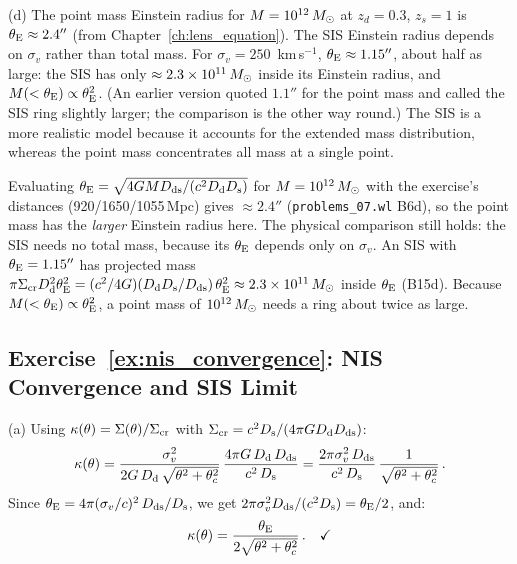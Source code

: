 (d) The point mass Einstein radius for $M = 10^{12}\,M_{\odot}$
at $z_d = 0.3$, $z_s = 1$ is $\theta_{\mathrm{E}} \approx 2.4''$ (from Chapter~\ref{ch:lens_equation}).
The SIS Einstein radius depends on $\sigma_v$ rather than total mass.
For $\sigma_v = 250$~km\,s$^{-1}$, $\theta_{\mathrm{E}} \approx 1.15''$, about half
as large: the SIS has only $\approx 2.3\times10^{11}\,M_{\odot}$ inside its
Einstein radius, and $M(<\theta_{\mathrm{E}})\propto\theta_{\mathrm{E}}^2$.  (An earlier version
quoted $1.1''$ for the point mass and called the SIS ring slightly larger;
the comparison is the other way round.)  The SIS is a more realistic model because it
accounts for the extended mass distribution, whereas the point mass
concentrates all mass at a single point.

\begin{annotation}[Check of (d)]
Evaluating $\theta_{\mathrm{E}} = \sqrt{4G MD_{\mathrm{ds}}/(c^2D_{\mathrm{d}}D_{\mathrm{s}})}$ for $M = 10^{12}\,M_{\odot}$
with the exercise's distances (920/1650/1055\,Mpc) gives $\approx2.4''$
(\texttt{problems\_07.wl} B6d), so the point mass has the
\emph{larger} Einstein radius here.  The physical comparison still holds: the SIS needs no total mass, because its
$\theta_{\mathrm{E}}$ depends only on $\sigma_v$.  An SIS with $\theta_{\mathrm{E}} = 1.15''$ has projected
mass $\pi\Sigma_{\mathrm{cr}}D_{\mathrm{d}}^2\theta_{\mathrm{E}}^2 = (c^2/4G)(D_{\mathrm{d}}D_{\mathrm{s}}/D_{\mathrm{ds}})\,\theta_{\mathrm{E}}^2\approx2.3\times10^{11}\,M_{\odot}$
inside $\theta_{\mathrm{E}}$ (B15d).  Because $M(<\theta_{\mathrm{E}})\propto\theta_{\mathrm{E}}^2$, a point mass of
$10^{12}\,M_{\odot}$ needs a ring about twice as large.
\end{annotation}


\subsection*{Exercise~\ref{ex:nis_convergence}: NIS Convergence and SIS Limit}

(a) Using $\kappa(\theta) = \Sigma(\theta)/\Sigma_{\mathrm{cr}}$ with
$\Sigma_{\mathrm{cr}} = c^2 D_{\mathrm{s}} / (4\pi G D_{\mathrm{d}} D_{\mathrm{ds}})$:
\begin{equation*}
    \kappa(\theta) = \frac{\sigma_v^2}{2G\,D_{\mathrm{d}}\,
    \sqrt{\theta^2 + \theta_c^2}}\,
    \frac{4\pi G\,D_{\mathrm{d}}\,D_{\mathrm{ds}}}{c^2\,D_{\mathrm{s}}}
    = \frac{2\pi\sigma_v^2\,D_{\mathrm{ds}}}{c^2\,D_{\mathrm{s}}}\,
    \frac{1}{\sqrt{\theta^2 + \theta_c^2}} \,.
\end{equation*}
Since $\theta_{\mathrm{E}} = 4\pi(\sigma_v/c)^2\,D_{\mathrm{ds}}/D_{\mathrm{s}}$, we get
$2\pi\sigma_v^2 D_{\mathrm{ds}}/(c^2 D_{\mathrm{s}}) = \theta_{\mathrm{E}}/2$, and:
\begin{equation*}
    \kappa(\theta) = \frac{\theta_{\mathrm{E}}}{2\sqrt{\theta^2 + \theta_c^2}}
    \,. \quad \checkmark
\end{equation*}

